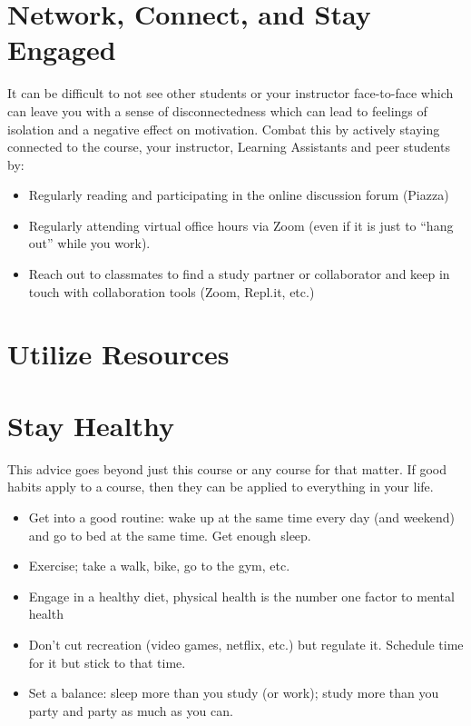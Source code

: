 \documentclass[12pt]{scrartcl}
\begin{document}
\section{Network, Connect, and Stay Engaged}

It can be difficult to not see other students or your instructor face-to-face
which can leave you with a sense of disconnectedness which can lead to feelings
of isolation and a negative effect on motivation.  Combat this by actively 
staying connected to the course, your instructor, Learning Assistants and peer
students by:

\begin{itemize}
  \item Regularly reading and participating in the online discussion forum (Piazza)
  \item Regularly attending virtual office hours via Zoom (even if it is just
  to ``hang out'' while you work).  
  \item Reach out to classmates to find a study partner or collaborator and keep
  in touch with collaboration tools (Zoom, Repl.it, etc.)
\end{itemize}

\section{Utilize Resources}

\section{Stay Healthy}

This advice goes beyond just this course or any course for that matter.  If
good habits apply to a course, then they can be applied to everything in your
life.  

\begin{itemize}
  \item Get into a good routine: wake up at the same time every day (and weekend)
  and go to bed at the same time.   Get enough sleep.
  \item Exercise; take a walk, bike, go to the gym, etc.
  \item Engage in a healthy diet, physical health is the number one factor to
  mental health
  \item Don't cut recreation (video games, netflix, etc.) but regulate it.  
  Schedule time for it but stick to that time.  
  \item Set a balance: sleep more than you study (or work); study more than you party
  and party as much as you can.
\end{itemize}
\end{document}
